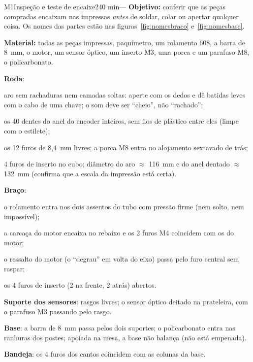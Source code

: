 \documentclass[11pt,a4paper]{article}
\newcommand{\aprox}{\ensuremath{\approx}}
\newcommand{\objetivo}[1]{{\color{azul!70!black}\textbf{Objetivo:} #1}\par\smallskip}
\begin{document}
\begin{tarefa}{M1}{Inspeção e teste de encaixe}{2}{40 min}{---}
\objetivo{conferir que as peças compradas encaixam nas impressas \emph{antes} de soldar,
colar ou apertar qualquer coisa. Os nomes das partes estão nas figuras~\ref{fig:nomesbraco}
e~\ref{fig:nomesbase}.}
\textbf{Material:} todas as peças impressas, paquímetro, um rolamento 608, a barra de 8~mm,
o motor, um sensor óptico, um inserto M3, uma porca e um parafuso M8, o policarbonato.
\begin{passos}
  \item \textbf{Roda}:
    \begin{checklist}
      \item aro sem rachaduras nem camadas soltas: aperte com os dedos e dê batidas leves
        com o cabo de uma chave; o som deve ser ``cheio'', não ``rachado'';
      \item os 40 dentes do anel do encoder inteiros, sem fios de plástico entre eles
        (limpe com o estilete);
      \item os 12 furos de 8,4~mm livres; a porca M8 entra no alojamento sextavado de trás;
      \item 4 furos de inserto no cubo; diâmetro do aro \aprox{} 116~mm e do anel dentado
        \aprox{} 132~mm (confirma que a escala da impressão está certa).
    \end{checklist}
  \item \textbf{Braço}:
    \begin{checklist}
      \item o rolamento entra nos dois assentos do tubo com pressão firme (nem solto, nem
        impossível);
      \item a carcaça do motor encaixa no rebaixo e os 2 furos M4 coincidem com os do motor;
      \item o ressalto do motor (o ``degrau'' em volta do eixo) passa pelo furo central sem
        raspar;
      \item os 4 furos de inserto (2 na frente, 2 atrás) abertos.
    \end{checklist}
  \item \textbf{Suporte dos sensores}: rasgos livres; o sensor óptico deitado na prateleira,
    com o parafuso M3 passando pelo rasgo.
  \item \textbf{Base}: a barra de 8~mm passa pelos dois suportes; o policarbonato entra nas
    ranhuras dos postes; apoiada na mesa, a base não balança (não está empenada).
  \item \textbf{Bandeja}: os 4 furos dos cantos coincidem com as colunas da base.

\end{passos}
\end{tarefa}
\end{document}
